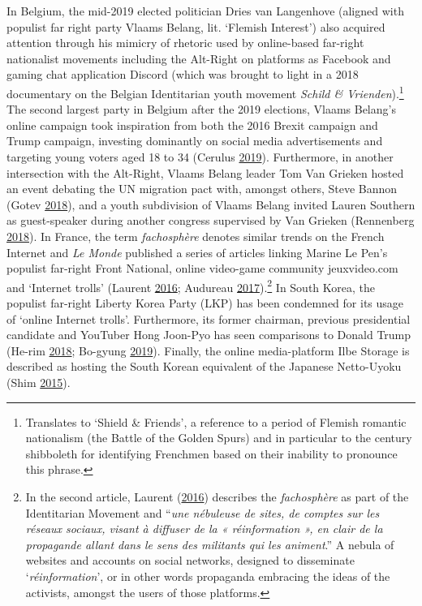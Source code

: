 \documentclass[10pt,british,A4paper,,openany]{memoir}
\begin{document}
In Belgium, the mid-2019 elected politician Dries van Langenhove
(aligned with populist far right party Vlaams Belang, lit. `Flemish
Interest') also acquired attention through his mimicry of rhetoric used
by online-based far-right nationalist movements including the Alt-Right
on platforms as Facebook and gaming chat application Discord (which was
brought to light in a 2018 documentary on the Belgian Identitarian youth
movement \emph{Schild \& Vrienden}).\footnote{Translates to `Shield \&
  Friends', a reference to a period of Flemish romantic nationalism (the
  Battle of the Golden Spurs) and in particular to the  century
  shibboleth for identifying Frenchmen based on their inability to
  pronounce this phrase.} The second largest party in Belgium after the
2019 elections, Vlaams Belang's online campaign took inspiration from
both the 2016 Brexit campaign and Trump campaign, investing dominantly
on social media advertisements and targeting young voters aged 18 to 34
(Cerulus \protect\hyperlink{ref-cerulus_inside_2019}{2019}).
Furthermore, in another intersection with the Alt-Right, Vlaams Belang
leader Tom Van Grieken hosted an event debating the UN migration pact
with, amongst others, Steve Bannon (Gotev
\protect\hyperlink{ref-gotev_vlaams_2018}{2018}), and a youth
subdivision of Vlaams Belang invited Lauren Southern as guest-speaker
during another congress supervised by Van Grieken (Rennenberg
\protect\hyperlink{ref-rennenberg_vlaams_2018}{2018}). In France, the
term \emph{fachosphère} denotes similar trends on the French Internet
and \emph{Le Monde} published a series of articles linking Marine Le
Pen's populist far-right Front National, online video-game community
jeuxvideo.com and `Internet trolls' (Laurent
\protect\hyperlink{ref-laurent_nordactu_2016}{2016}; Audureau
\protect\hyperlink{ref-audureau_les_2017}{2017}).\footnote{In the second
  article, Laurent (\protect\hyperlink{ref-laurent_nordactu_2016}{2016})
  describes the \emph{fachosphère} as part of the Identitarian Movement
  and ``\emph{une nébuleuse de sites, de comptes sur les réseaux
  sociaux, visant à diffuser de la « réinformation », en clair de la
  propagande allant dans le sens des militants qui les animent}.'' A
  nebula of websites and accounts on social networks, designed to
  disseminate `\emph{réinformation}', or in other words propaganda
  embracing the ideas of the activists, amongst the users of those
  platforms.} In South Korea, the populist far-right Liberty Korea Party
(LKP) has been condemned for its usage of `online Internet trolls'.
Furthermore, its former chairman, previous presidential candidate and
YouTuber Hong Joon-Pyo has seen comparisons to Donald Trump (He-rim
\protect\hyperlink{ref-he-rim_firebrand_2018}{2018}; Bo-gyung
\protect\hyperlink{ref-bo-gyung_youtube_2019}{2019}). Finally, the
online media-platform Ilbe Storage is described as hosting the South
Korean equivalent of the Japanese Netto-Uyoku (Shim
\protect\hyperlink{ref-shim_hardcore_2015}{2015}).
\end{document}
